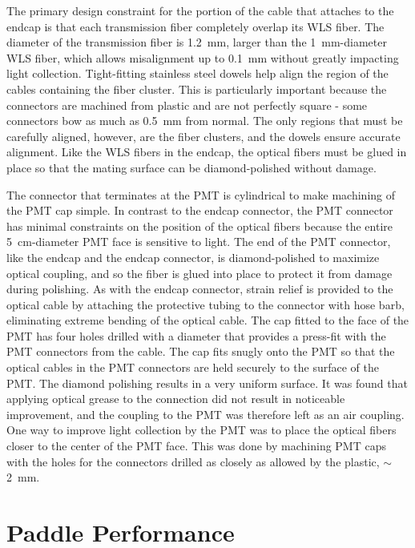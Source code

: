 The primary design constraint for the portion of the cable that attaches to the endcap is that each transmission fiber completely overlap its WLS fiber.  The diameter of the transmission fiber is 1.2~mm, larger than the 1~mm-diameter WLS fiber, which allows misalignment up to 0.1~mm without greatly impacting light collection.  Tight-fitting stainless steel dowels help align the region of the cables containing the fiber cluster.  This is particularly important because the connectors are machined from plastic and are not perfectly square - some connectors bow as much as 0.5~mm from normal.  The only regions that must be carefully aligned, however, are the fiber clusters, and the dowels ensure accurate alignment.  Like the WLS fibers in the endcap, the optical fibers must be glued in place so that the mating surface can be diamond-polished without damage.  

The connector that terminates at the PMT is cylindrical to make machining of the PMT cap simple.  In contrast to the endcap connector, the PMT connector has minimal constraints on the position of the optical fibers because the entire 5~cm-diameter PMT face is sensitive to light.  The end of the PMT connector, like the endcap and the endcap connector, is diamond-polished to maximize optical coupling, and so the fiber is glued into place to protect it from damage during polishing.  As with the endcap connector, strain relief is provided to the optical cable by attaching the protective tubing to the connector with hose barb, eliminating extreme bending of the optical cable.    
The cap fitted to the face of the PMT has four holes drilled with a diameter that provides a press-fit with the PMT connectors from the cable.  The cap fits snugly onto the PMT so that the optical cables in the PMT connectors are held securely to the surface of the PMT.  The diamond polishing results in a very uniform surface.  It was found that applying optical grease to the connection did not result in noticeable improvement, and the coupling to the PMT was therefore left as an air coupling.  One way to improve light collection by the PMT was to place the optical fibers closer to the center of the PMT face.  This was done by machining PMT caps with the holes for the connectors drilled as closely as allowed by the plastic, $\sim$2~mm.


\section{Paddle Performance}
\label{sec:singleVeto}

